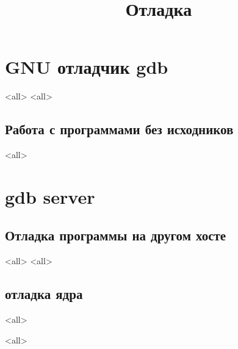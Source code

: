 
\title[Отладка]{Отладка}





\begin{frame}
	\frametitle{}
	\titlepage
	\vspace{-0.5cm}
	\begin{center}
	\end{center}
\end{frame}

\begin{frame}
	\tableofcontents
\end{frame}




\section[gdb]{GNU отладчик gdb}
\mode<all>{}
\mode<all>{}
\subsection[gdb disasm]{Работа с программами без исходников}
\mode<all>{}
\section[gdb server]{gdb server}
\subsection[gdbserver]{Отладка программы на другом хосте}
\mode<all>{}
\mode<all>{}
\subsection[kernel]{отладка ядра}
\mode<all>{}

\mode<all>

